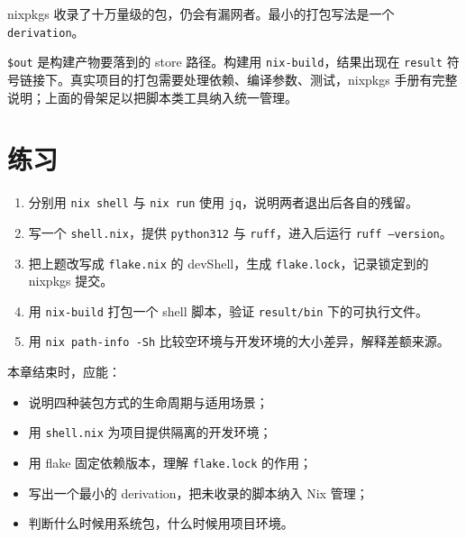 nixpkgs 收录了十万量级的包，仍会有漏网者。最小的打包写法是一个 \texttt{derivation}。


\texttt{\$out} 是构建产物要落到的 store 路径。构建用 \texttt{nix-build}，结果出现在 \texttt{result} 符号链接下。真实项目的打包需要处理依赖、编译参数、测试，nixpkgs 手册有完整说明；上面的骨架足以把脚本类工具纳入统一管理。

\section{练习}

\begin{enumerate}
  \item 分别用 \texttt{nix shell} 与 \texttt{nix run} 使用 \texttt{jq}，说明两者退出后各自的残留。
  \item 写一个 \texttt{shell.nix}，提供 \texttt{python312} 与 \texttt{ruff}，进入后运行 \texttt{ruff --version}。
  \item 把上题改写成 \texttt{flake.nix} 的 devShell，生成 \texttt{flake.lock}，记录锁定到的 nixpkgs 提交。
  \item 用 \texttt{nix-build} 打包一个 shell 脚本，验证 \texttt{result/bin} 下的可执行文件。
  \item 用 \texttt{nix path-info -Sh} 比较空环境与开发环境的大小差异，解释差额来源。
\end{enumerate}

\begin{checkpoint}
本章结束时，应能：
\begin{itemize}
  \item 说明四种装包方式的生命周期与适用场景；
  \item 用 \texttt{shell.nix} 为项目提供隔离的开发环境；
  \item 用 flake 固定依赖版本，理解 \texttt{flake.lock} 的作用；
  \item 写出一个最小的 derivation，把未收录的脚本纳入 Nix 管理；
  \item 判断什么时候用系统包，什么时候用项目环境。
\end{itemize}
\end{checkpoint}

